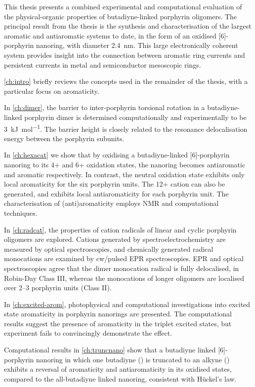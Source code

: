 This thesis presents a combined experimental and computational evaluation of the physical-organic properties of butadiyne-linked porphyrin oligomers. The principal result from the thesis is the synthesis and characterisation of the largest aromatic and antiaromatic systems to date, in the form of an oxidised [6]-porphyrin nanoring, with diameter \SI{2.4}{\nano\meter}. This large electronically coherent system provides insight into the connection between aromatic ring currents and persistent currents in metal and semiconductor mesoscopic rings. 

\autoref{ch:intro} briefly reviews the concepts used in the remainder of the thesis, with a particular focus on aromaticity.

In \autoref{ch:dimer}, the barrier to inter-porphyrin torsional rotation in a butadiyne-linked porphyrin dimer is determined computationally and experimentally to be \SI{3}{\kilo\joule\per\mole}. The barrier height is closely related to the resonance delocalisation energy between the porphyrin subunits. 

In \autoref{ch:hexacat} we show that by oxidising a butadiyne-linked [6]-porphyrin nanoring to its 4+ and 6+ oxidation states, the nanoring becomes antiaromatic and aromatic respectively. In contrast, the neutral oxidation state exhibits only local aromaticity for the six porphyrin units. The 12+ cation can also be generated, and exhibits local antiaromaticity for each porphyrin unit. The characterisation of (anti)aromaticity employs NMR and computational techniques. 

In \autoref{ch:radcat}, the properties of cation radicals of linear and cyclic porphyrin oligomers are explored. Cations generated by spectroelectrochemistry are measured by optical spectroscopies, and chemically generated radical monocations are examined by cw/pulsed EPR spectroscopies. EPR and optical spectroscopies agree that the dimer monocation radical is fully delocalised, in Robin-Day Class III, whereas the monocations of longer oligomers are localised over 2--3 porphyrin units (Class II).

In \autoref{ch:excited-arom}, photophysical and computational investigations into excited state aromaticity in porphyrin nanorings are presented. The computational results suggest the presence of aromaticity in the triplet excited states, but experiment fails to convincingly demonstrate the effect. 

Computational results in \autoref{ch:truncnano} show that a butadiyne linked [6]-porphyrin nanoring in which one butadiyne () is truncated to an alkyne () exhibits a reversal of aromaticity and antiaromaticity in its oxidised states, compared to the all-butadiyne linked nanoring, consistent with H\"uckel’s law.
